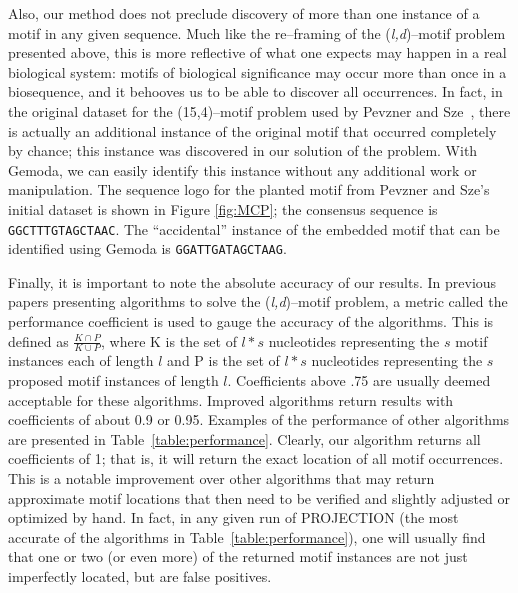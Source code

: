     Also, our method does not preclude discovery of more than one instance of a
    motif in any given sequence.  Much
    like the re--framing of the (\textit{l,d})--motif problem presented above,
    this is more
    reflective of what one expects may happen in a real biological system:
    motifs of biological significance may occur more than once in a
    biosequence, and it behooves us to be able to discover all occurrences.
    In fact, in the original dataset for the (15,4)--motif problem used by
    Pevzner and Sze~\cite{pevzner2000combinatorial}, there is actually an additional
    instance of the original
    motif that occurred completely by chance; this instance was discovered in
    our solution of the problem.    With
    Gemoda, we can easily identify this instance without any
    additional work or manipulation.
    The sequence logo for the planted motif from
    Pevzner and Sze's initial dataset is shown in
    Figure \vref{fig:MCP}; the consensus sequence
    is \texttt{GGCTTTGTAGCTAAC}.  The ``accidental''
    instance of the embedded motif that can be identified
    using
    Gemoda is \texttt{GGATTGATAGCTAAG}.

    Finally, it is important to note the absolute accuracy of our results.
    In previous papers presenting algorithms to solve
    the (\textit{l,d})--motif problem, a metric called the performance coefficient is used
    to gauge the accuracy of the algorithms.  This is defined as
    $ \frac{K \cap P}{K \cup P}$, where K is the set of $l*s$ nucleotides
    representing the $s$ motif instances each of length $l$ and P is
    the set of $l*s$
    nucleotides representing the $s$ proposed motif instances of length $l$.
    Coefficients above .75 are usually deemed acceptable for these algorithms.
    Improved algorithms return results with coefficients of about 0.9 or 0.95.
    Examples of the performance of other algorithms are presented in
    Table~\ref{table:performance}.   Clearly, our algorithm returns all coefficients of 1; that
    is, it will return the exact location of all motif occurrences.  This is
    a notable improvement over other algorithms that may return approximate
    motif locations that then need to be verified and slightly adjusted or
    optimized by hand.  In fact, in any given run of PROJECTION (the most accurate
    of the algorithms in Table~\ref{table:performance}), one will usually find
    that one or two (or even more) of the returned motif instances are
    not just imperfectly located, but are false positives.

